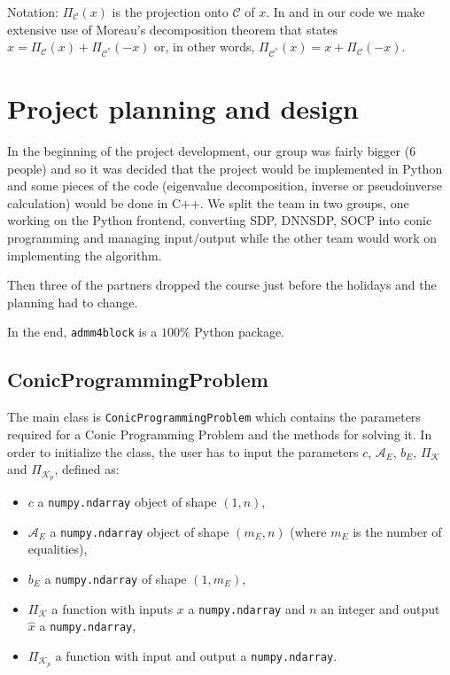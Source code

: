 \documentclass[paper=a4, fontsize=11pt]{scrartcl}
\numberwithin{equation}{section}		%
\numberwithin{figure}{section}			%
\numberwithin{table}{section}				%
\begin{document}
Notation: $\Pi_\mathcal{C}(x)$ is the projection onto $\mathcal{C}$ of $x$. In \cite{sun2014} and in our code we make extensive use of Moreau's decomposition theorem that states $x = \Pi_{\mathcal{C}}(x)+ \Pi_{\mathcal{C}^*}(-x)$ or, in other words, $\Pi_{\mathcal{C}^*}(x) = x + \Pi_{\mathcal{C}}(-x)$.

\section{Project planning and design}

In the beginning of the project development, our group was fairly bigger (6 people) and so it was decided that the project would be implemented in Python and some pieces of the code (eigenvalue decomposition, inverse or pseudoinverse calculation) would be done in C++. We split the team in two groups, one working on the Python frontend, converting SDP, DNNSDP, SOCP into conic programming and managing input/output while the other team would work on implementing the algorithm.

Then three of the partners dropped the course just before the holidays and the planning had to change.

In the end, \texttt{admm4block} is a $100\%$ Python package. 

\subsection{ConicProgrammingProblem}

The main class is \texttt{ConicProgrammingProblem} which contains the parameters required for a Conic Programming Problem and the methods for solving it. In order to initialize the class, the user has to input the parameters $c$, $\mathcal{A}_E$, $b_E$, $\Pi_{\mathcal{K}}$ and $\Pi_{\mathcal{K}_p}$, defined as:

\begin{itemize}
\item $c$ a \texttt{numpy.ndarray} object of shape $(1,n)$,
\item $\mathcal{A}_E$ a \texttt{numpy.ndarray} object of shape $(m_E,n)$ (where $m_E$ is the number of equalities),
\item $b_E$ a \texttt{numpy.ndarray} of shape $(1,m_E)$,
\item $\Pi_{\mathcal{K}}$ a function with inputs $x$ a \texttt{numpy.ndarray} and $n$ an integer and output \\$\hat{x}$ a \texttt{numpy.ndarray},
\item $\Pi_{\mathcal{K}_p}$ a function with input and output a \texttt{numpy.ndarray}.
\end{itemize}
\end{document}
